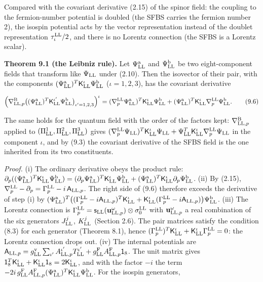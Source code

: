 \documentclass[
  10pt,
]{article}
\begin{document}
Compared with the covariant derivative (2.15) of the spinor field: the
coupling to the fermion-number potential is doubled (the SFBS carries
the fermion number 2), the isospin potential acts by the vector
representation instead of the doublet representation
\(\tau^{\rm LL}_\iota/2\), and there is no Lorentz connection (the SFBS
is a Lorentz scalar).

\textbf{Theorem 9.1 (the Leibniz rule).} Let \(\Psi^{\rm a}_{\rm LL}\)
and \(\Psi^{\rm b}_{\rm LL}\) be two eight-component fields that
transform like \(\Psi_{\rm LL}\) under (2.10). Then the isovector of
their pair, with the components
\((\Psi^{\rm a}_{\rm LL})^T\mathsf K^\iota_{\rm LL}\Psi^{\rm b}_{\rm LL}\)
(\(\iota=1,2,3\)), has the covariant derivative

\[\Big(\nabla^{\rm B}_{{\rm LL},p}\big((\Psi^{\rm a}_{\rm LL})^T\mathsf K^{\iota'}_{\rm LL}\Psi^{\rm b}_{\rm LL}\big)_{\iota'=1,2,3}\Big)^\iota=(\nabla^{\rm LL}_p\Psi^{\rm a}_{\rm LL})^T\mathsf K^\iota_{\rm LL}\Psi^{\rm b}_{\rm LL}+(\Psi^{\rm a}_{\rm LL})^T\mathsf K^\iota_{\rm LL}\nabla^{\rm LL}_p\Psi^{\rm b}_{\rm LL}.\tag{9.6}\]

The same holds for the quantum field with the order of the factors kept:
\(\nabla^{\rm B}_{{\rm LL},p}\) applied to
\((\Pi^1_{\rm LL},\Pi^2_{\rm LL},\Pi^3_{\rm LL})\) gives
\((\nabla^{\rm LL}_p\Psi_{\rm LL})^T\mathsf K^\iota_{\rm LL}\Psi_{\rm LL}+\Psi^T_{\rm LL}\mathsf K^\iota_{\rm LL}\nabla^{\rm LL}_p\Psi_{\rm LL}\)
in the component \(\iota\), and by (9.3) the covariant derivative of the
SFBS field is the one inherited from its two constituents.

\emph{Proof.} (i) The ordinary derivative obeys the product rule:
\(\partial_p((\Psi^{\rm a}_{\rm LL})^T\mathsf K^\iota_{\rm LL}\Psi^{\rm b}_{\rm LL})=(\partial_p\Psi^{\rm a}_{\rm LL})^T\mathsf K^\iota_{\rm LL}\Psi^{\rm b}_{\rm LL}+(\Psi^{\rm a}_{\rm LL})^T\mathsf K^\iota_{\rm LL}\partial_p\Psi^{\rm b}_{\rm LL}\).
(ii) By (2.15),
\(\nabla^{\rm LL}_p-\partial_p=\Gamma^{\rm LL}_p-i\,\mathsf A_{{\rm LL},p}\).
The right side of (9.6) therefore exceeds the derivative of step (i) by
\((\Psi^{\rm a}_{\rm LL})^T\big((\Gamma^{\rm LL}_p-i\mathsf A_{{\rm LL},p})^T\mathsf K^\iota_{\rm LL}+\mathsf K^\iota_{\rm LL}(\Gamma^{\rm LL}_p-i\mathsf A_{{\rm LL},p})\big)\Psi^{\rm b}_{\rm LL}\).
(iii) The Lorentz connection is
\(\Gamma^{\rm LL}_p=\mathsf s_{\rm LL}(\mathbf u^\omega_{{\rm LL},p})\otimes\sigma^{\rm LL}_0\)
with \(\mathbf u^\omega_{{\rm LL},p}\) a real combination of the six
generators \(J^j_{\rm LL}\), \(K^j_{\rm LL}\) (Section 2.6). The pair
matrices satisfy the condition (8.3) for each generator (Theorem 8.1),
hence
\((\Gamma^{\rm LL}_p)^T\mathsf K^\iota_{\rm LL}+\mathsf K^\iota_{\rm LL}\Gamma^{\rm LL}_p=0\):
the Lorentz connection drops out. (iv) The internal potentials are
\(\mathsf A_{{\rm LL},p}=g^{\rm v}_{\rm LL}\sum_{\iota'}A^{\iota'}_{{\rm LL},p}T^{\iota'}_{\rm LL}+g^{\rm F}_{\rm LL}A^{\rm F}_{{\rm LL},p}\mathsf 1_8\).
The unit matrix gives
\(\mathsf 1_8^T\mathsf K^\iota_{\rm LL}+\mathsf K^\iota_{\rm LL}\mathsf 1_8=2\mathsf K^\iota_{\rm LL}\),
and with the factor \(-i\) the term
\(-2i\,g^{\rm F}_{\rm LL}A^{\rm F}_{{\rm LL},p}(\Psi^{\rm a}_{\rm LL})^T\mathsf K^\iota_{\rm LL}\Psi^{\rm b}_{\rm LL}\).
For the isospin generators,
\end{document}
